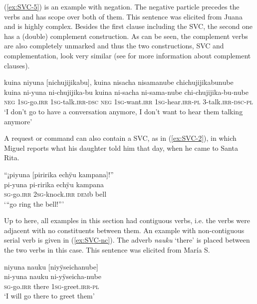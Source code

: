 (\ref{ex:SVC-5}) is an example with negation. The negative particle precedes the verbs and has scope over both of them. This sentence was elicited from Juana and is highly complex. Besides the first clause including the SVC, the second one has a (double) complement construction. As can be seen, the complement verbs are also completely unmarked and thus the two constructions, SVC and complementation, look very similar (see  for more information about complement clauses).


\ea\label{ex:SVC-5}
\begingl
\glpreamble kuina niyuna \textup{[}nichujijikabu\textup{]}, kuina nisacha nisamanube chichujijikabunube\\
\gla kuina ni-yuna ni-chujijika-bu kuina ni-sacha ni-sama-nube chi-chujijika-bu-nube\\
\glb \textsc{neg} 1\textsc{sg}-go.\textsc{irr} 1\textsc{sg}-talk.\textsc{irr}-\textsc{dsc} \textsc{neg} 1\textsc{sg}-want.\textsc{irr} 1\textsc{sg}-hear.\textsc{irr}-\textsc{pl} 3-talk.\textsc{irr}-\textsc{dsc}-\textsc{pl}\\
\glft ‘I don’t go to have a conversation anymore, I don’t want to hear them talking anymore’
\endgl
\trailingcitation{[jxx-e190210s-01]}
\xe

A request or command can also contain a SVC, as in (\ref{ex:SVC-2}), in which Miguel reports what his daughter told him that day, when he came to Santa Rita.

\ea\label{ex:SVC-2}
\begingl
\glpreamble “¡piyuna \textup{[}piririka echÿu kampana\textup{]}!”\\
\gla pi-yuna pi-ririka echÿu kampana\\
\textsc{sg}-go.\textsc{irr} 2\textsc{sg}-knock.\textsc{irr} \textsc{dem}b bell\\
\glft ‘“go ring the bell!”’
\endgl
\trailingcitation{[mxx-n101017s-2.075-076]}
\xe

Up to here, all examples in this section had contiguous verbs, i.e. the verbs were adjacent with no constituents between them. An example with non-contiguous serial verb is given in (\ref{ex:SVC-nc}). The adverb \textit{nauku} ‘there’ is placed between the two verbs in this case. This sentence was elicited from María S.

\ea\label{ex:SVC-nc}
\begingl
\glpreamble niyuna nauku \textup{[}niyÿseichanube\textup{]}\\
\gla ni-yuna nauku ni-yÿseicha-nube\\
\textsc{sg}-go.\textsc{irr} there 1\textsc{sg}-greet.\textsc{irr}-\textsc{pl}\\
\glft ‘I will go there to greet them’
\endgl
\trailingcitation{[rxx-e181022le]}
\xe

